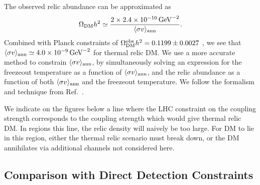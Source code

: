 The observed relic abundance can be approximated as
%
\begin{equation}
\Omega_{\rm DM}h^2\simeq \frac{2\times2.4\times 10^{-10}\,{\rm GeV}^{-2}}{\langle\sigma v\rangle_{\rm ann}}.
\label{simplerelic}
\end{equation}
%
Combined with Planck constraints of $\Omega_{\rm DM}^{\rm obs}h^2=0.1199\pm0.0027$ \cite{Ade:2013zuv}, we see that $\langle\sigma v\rangle_{\rm ann}\simeq 4.0\times 10^{-9}\,{\rm GeV}^{-2}$ for thermal relic DM.
%
We use a more accurate method to constrain $\langle\sigma v\rangle_{\rm ann}$, by simultaneously solving an expression for the freezeout temperature as a function of $\langle\sigma v\rangle_{\rm ann}$, and the relic abundance as a function of both $\langle\sigma v\rangle_{\rm ann}$ and the freezeout temperature. We follow the formalism and technique from Ref.~\cite{Busoni:2014gta}.

We indicate on the figures below a line where the LHC constraint on the coupling strength corresponds to the coupling strength which would give thermal relic DM. In regions  this line, the relic density will naively be too large. For DM to lie in this region, either the thermal relic scenario must break down, or the DM annihilates via additional channels not considered here.

\subsection{Comparison with Direct Detection Constraints}
